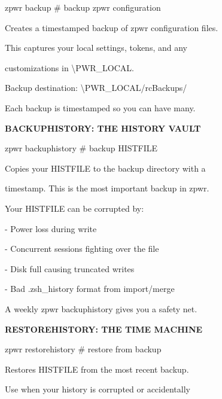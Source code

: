 \documentclass[11pt,a4paper,twoside]{book}
\begin{document}
\begin{codebox}
zpwr backup                         \# backup zpwr configuration\\
\end{codebox}

Creates a timestamped backup of zpwr configuration files.

This captures your local settings, tokens, and any

customizations in \textbackslash{}PWR\_LOCAL.

Backup destination: \textbackslash{}PWR\_LOCAL/rcBackups/

Each backup is timestamped so you can have many.


\vspace{12pt}
{\bfseries\color{neonyellow} BACKUPHISTORY: THE HISTORY VAULT}\vspace{4pt}

\begin{codebox}
zpwr backuphistory                  \# backup HISTFILE\\
\end{codebox}

Copies your HISTFILE to the backup directory with a

timestamp. This is the most important backup in zpwr.

Your HISTFILE can be corrupted by:

- Power loss during write

- Concurrent sessions fighting over the file

- Disk full causing truncated writes

- Bad .zsh\_history format from import/merge

\begin{codebox}
A weekly zpwr backuphistory gives you a safety net.\\
\end{codebox}


\vspace{12pt}
{\bfseries\color{neonyellow} RESTOREHISTORY: THE TIME MACHINE}\vspace{4pt}

\begin{codebox}
zpwr restorehistory                 \# restore from backup\\
\end{codebox}

Restores HISTFILE from the most recent backup.

Use when your history is corrupted or accidentally
\end{document}
